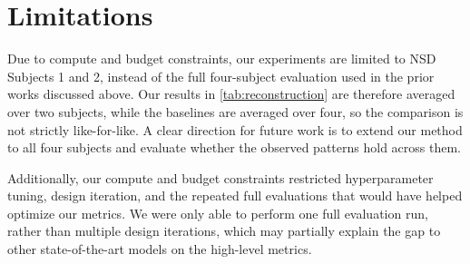 \section{Limitations}
\label{sec:limitations}

Due to compute and budget constraints, our experiments are limited to NSD Subjects 1 and 2, instead of the full four-subject evaluation used in the prior works discussed above. Our results in \cref{tab:reconstruction} are therefore averaged over two subjects, while the baselines are averaged over four, so the comparison is not strictly like-for-like. A clear direction for future work is to extend our method to all four subjects and evaluate whether the observed patterns hold across them.

Additionally, our compute and budget constraints restricted hyperparameter tuning, design iteration, and the repeated full evaluations that would have helped optimize our metrics. We were only able to perform one full evaluation run, rather than multiple design iterations, which may partially explain the gap to other state-of-the-art models on the high-level metrics.